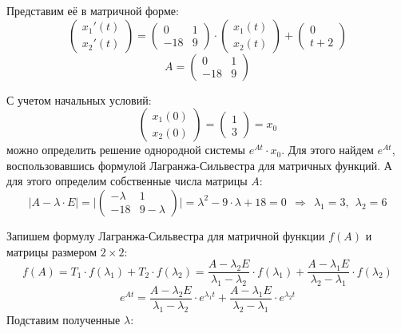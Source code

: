 Представим её в матричной форме:
\begin{displaymath}
\begin{pmatrix}
x_1'(t)
\\
x_2'(t)
\end{pmatrix}
=
\begin{pmatrix}
0  & 1
\\
-18 & 9
\end{pmatrix}
\cdot
\begin{pmatrix}
x_1(t)
\\
x_2(t)
\end{pmatrix}
+
\begin{pmatrix}
0
\\
t + 2
\end{pmatrix}
\end{displaymath}
\begin{displaymath}
A = \begin{pmatrix}
0 & 1
\\
-18 & 9
\end{pmatrix}
\end{displaymath}

С учетом начальных условий:
\begin{displaymath}
\begin{pmatrix}
x_1(0)
\\
x_2(0)
\end{pmatrix}
=
\begin{pmatrix}
1
\\
3
\end{pmatrix}
=
x_0
\end{displaymath}
можно определить решение однородной системы $e^{At} \cdot x_0$. Для этого найдем $e^{At}$, воспользовавшись формулой Лагранжа-Сильвестра для матричных функций. А для этого определим собственные числа матрицы $A$:
\begin{displaymath}
\Big | A - \lambda \cdot E \Big | = \Big | \begin{pmatrix}
-\lambda & 1
\\
-18 & 9 - \lambda
\end{pmatrix} \Big | = \lambda^2 - 9 \cdot \lambda + 18 = 0 \ \ \Rightarrow \ \ \lambda_1 = 3,\ \ \lambda_2 = 6
\end{displaymath}

Запишем формулу Лагранжа-Сильвестра для матричной функции $f(A)$ и матрицы размером $2 \times 2$:
\begin{displaymath}
f(A) = T_1 \cdot f(\lambda_1) + T_2 \cdot f(\lambda_2) = \frac{A - \lambda_2 E}{\lambda_1 - \lambda_2} \cdot  f(\lambda_1) + \frac{A - \lambda_1 E}{\lambda_2 - \lambda_1} \cdot f(\lambda_2)
\end{displaymath}
\begin{displaymath}
e^{At} = \frac{A - \lambda_2 E}{\lambda_1 - \lambda_2} \cdot e^{\lambda_1 t} + \frac{A - \lambda_1 E}{\lambda_2 - \lambda_1} \cdot e^{\lambda_2 t}
\end{displaymath}
Подставим полученные $\lambda$:


